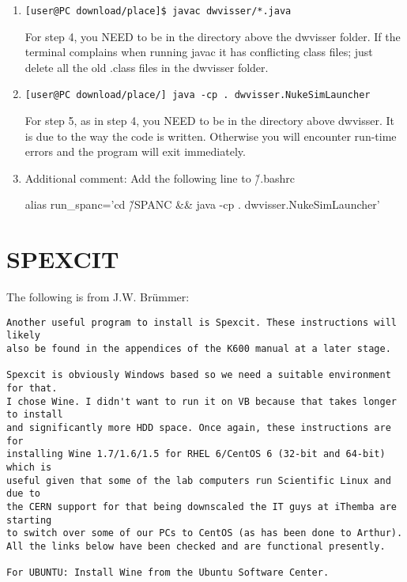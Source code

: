 \documentclass[11pt]{report}
\begin{document}
\begin{enumerate}
\item
\begin{verbatim}
[user@PC download/place]$ javac dwvisser/*.java
\end{verbatim} 

For step 4, you NEED to be in the directory above the dwvisser folder. 
If the terminal complains when running javac it has conflicting class files; 
just delete all the old .class files in the dwvisser folder.

\item
\begin{verbatim}
[user@PC download/place/] java -cp . dwvisser.NukeSimLauncher
\end{verbatim} 

For step 5, as in step 4, you NEED to be in the directory above dwvisser. 
It is due to the way the code is written. Otherwise you will encounter 
run-time errors and the program will exit immediately.


\item
Additional comment:
Add the following line to \~/.bashrc

alias run\_spanc='cd \~/SPANC \&\& java -cp . dwvisser.NukeSimLauncher'

\end{enumerate}


\section{SPEXCIT}

The following is from J.W. Br\"ummer:

\begin{verbatim}
Another useful program to install is Spexcit. These instructions will likely 
also be found in the appendices of the K600 manual at a later stage.

Spexcit is obviously Windows based so we need a suitable environment for that. 
I chose Wine. I didn't want to run it on VB because that takes longer to install 
and significantly more HDD space. Once again, these instructions are for 
installing Wine 1.7/1.6/1.5 for RHEL 6/CentOS 6 (32-bit and 64-bit) which is 
useful given that some of the lab computers run Scientific Linux and due to 
the CERN support for that being downscaled the IT guys at iThemba are starting 
to switch over some of our PCs to CentOS (as has been done to Arthur). 
All the links below have been checked and are functional presently.

For UBUNTU: Install Wine from the Ubuntu Software Center.
\end{verbatim} 
\end{document}
